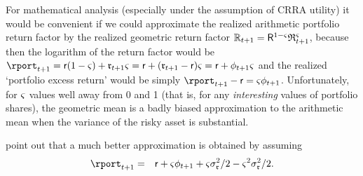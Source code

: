For mathematical analysis (especially under the assumption of CRRA
utility) it would be convenient if we could approximate the realized
arithmetic portfolio return factor by the realized geometric return
factor
$\mathbb{R}_{t+1}=\mathsf{R}^{1-{\varsigma}}\mathfrak{R}_{t+1}^{{\varsigma}}$,
because then the logarithm of the return factor would be $\rport_{t+1}
= \rfree (1-\riskyshare)+\risky_{t+1}\riskyshare = \rfree +
(\risky_{t+1}-\rfree)\riskyshare = \rfree + \eprem_{t+1} \riskyshare$
and the realized `portfolio excess return' would be simply
$\rport_{t+1}-\rfree = \riskyshare\eprem_{t+1}$.  Unfortunately, for
${\varsigma}$ values well away from 0 and 1 (that is, for any {\it
  interesting} values of portfolio shares), the geometric mean is a
badly biased approximation to the arithmetic mean when the variance of
the risky asset is substantial.

\cite{cvAppendix} point out that a much better approximation is obtained by assuming
\begin{eqnarray}
  \rport_{t+1} & = & \rfree+ \riskyshare \eprem_{t+1}+\riskyshare \sigma^{2}_{\risky}/2 - \riskyshare^{2}\sigma^{2}_{\risky}/2 \label{eq:rportCV}.
\end{eqnarray}

